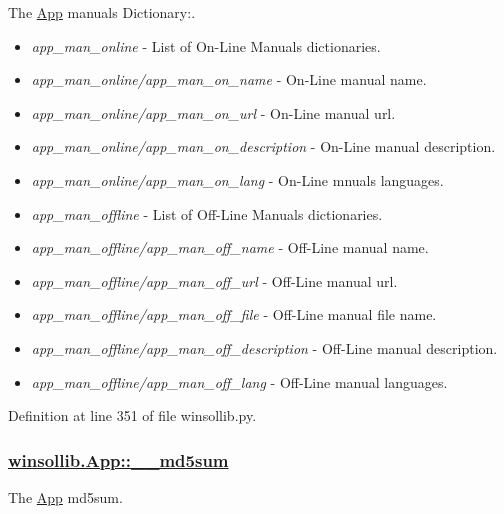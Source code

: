 The \hyperlink{classwinsollib_1_1App}{App} manuals Dictionary:. 

\begin{itemize}
\item {\em app\_\-man\_\-online\/} - List of On-Line Manuals dictionaries. \item {\em app\_\-man\_\-online/app\_\-man\_\-on\_\-name\/} - On-Line manual name. \item {\em app\_\-man\_\-online/app\_\-man\_\-on\_\-url\/} - On-Line manual url. \item {\em app\_\-man\_\-online/app\_\-man\_\-on\_\-description\/} - On-Line manual description. \item {\em app\_\-man\_\-online/app\_\-man\_\-on\_\-lang\/} - On-Line mnuals languages.\end{itemize}
\begin{itemize}
\item {\em app\_\-man\_\-offline\/} - List of Off-Line Manuals dictionaries. \item {\em app\_\-man\_\-offline/app\_\-man\_\-off\_\-name\/} - Off-Line manual name. \item {\em app\_\-man\_\-offline/app\_\-man\_\-off\_\-url\/} - Off-Line manual url. \item {\em app\_\-man\_\-offline/app\_\-man\_\-off\_\-file\/} - Off-Line manual file name. \item {\em app\_\-man\_\-offline/app\_\-man\_\-off\_\-description\/} - Off-Line manual description. \item {\em app\_\-man\_\-offline/app\_\-man\_\-off\_\-lang\/} - Off-Line manual languages. \end{itemize}


Definition at line 351 of file winsollib.py.\hypertarget{classwinsollib_1_1App_fde8367a61f0604aba66fc328f15bb61}{
\subsubsection[\_\-\_\-md5sum]{\setlength{\rightskip}{0pt plus 5cm}\hyperlink{classwinsollib_1_1App_fde8367a61f0604aba66fc328f15bb61}{winsollib.App::\_\-\_\-md5sum}}}
\label{classwinsollib_1_1App_fde8367a61f0604aba66fc328f15bb61}


The \hyperlink{classwinsollib_1_1App}{App} md5sum. 



